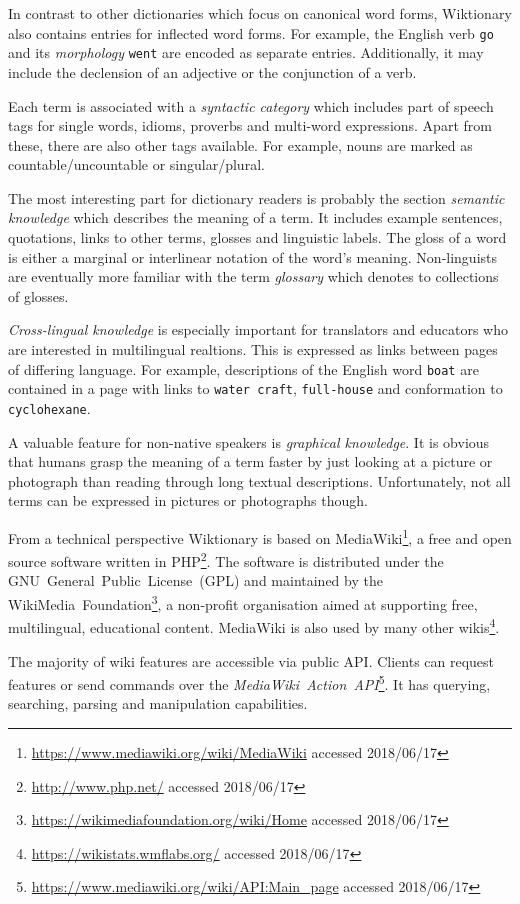 In contrast to other dictionaries which focus on canonical word forms, Wiktionary also contains entries for inflected word forms. For example, the English verb \texttt{go} and its \textit{morphology} \texttt{went} are encoded as separate entries. Additionally, it may include the declension of an adjective or the conjunction of a verb.

Each term is associated with a \textit{syntactic category} which includes part of speech tags for single words, idioms, proverbs and multi-word expressions. Apart from these, there are also other tags available. For example, nouns are marked as countable/uncountable or singular/plural. 

The most interesting part for dictionary readers is probably the section \textit{semantic knowledge} which describes the meaning of a term. It includes example sentences, quotations, links to other terms, glosses and linguistic labels. The gloss of a word is either a marginal or interlinear notation of the word's meaning. Non-linguists are eventually more familiar with the term \emph{glossary} which denotes to collections of glosses. 

\textit{Cross-lingual knowledge} is especially important for translators and educators who are interested in multilingual realtions. This is expressed as links between pages of differing language. For example, descriptions of the English word \texttt{boat} are contained in a page with links to \texttt{water~craft}, \texttt{full-house} and conformation to \texttt{cyclohexane}.

A valuable feature for non-native speakers is \emph{graphical knowledge}. It is obvious that humans grasp the meaning of a term faster by just looking at a picture or photograph than reading through long textual descriptions. Unfortunately, not all terms can be expressed in pictures or photographs though. 

From a technical perspective Wiktionary is based on MediaWiki\footnote{\url{https://www.mediawiki.org/wiki/MediaWiki} accessed 2018/06/17}, a free and open source software written in PHP\footnote{\url{http://www.php.net/} accessed 2018/06/17}. The software is distributed under the GNU~General~Public~License~(GPL) and maintained by the WikiMedia~Foundation\footnote{\url{https://wikimediafoundation.org/wiki/Home} accessed 2018/06/17}, a non-profit organisation aimed at supporting free, multilingual, educational content. MediaWiki is also used by many other wikis\footnote{\url{https://wikistats.wmflabs.org/} accessed 2018/06/17}.

The majority of wiki features are accessible via public API. Clients can request features or send commands over the \textit{MediaWiki~Action~API}\footnote{\url{https://www.mediawiki.org/wiki/API:Main_page} accessed 2018/06/17}. It has querying, searching, parsing and manipulation capabilities.
